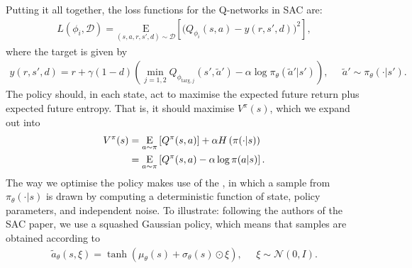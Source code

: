 \documentclass[letterpaper,10pt,english]{sphinxmanual}
\newcommand{\E}{{\mathrm E}}
\newcommand{\underE}[2]{\underset{\begin{subarray}{c}#1 \end{subarray}}{\E}\left[ #2 \right]}
\begin{document}
Putting it all together, the loss functions for the Q-networks in SAC are:
\begin{equation*}
\begin{split}L(\phi_i, {\mathcal D}) = \underset{(s,a,r,s',d) \sim {\mathcal D}}{{\mathrm E}}\left[
    \Bigg( Q_{\phi_i}(s,a) - y(r,s',d) \Bigg)^2
    \right],\end{split}
\end{equation*}
where the target is given by
\begin{equation*}
\begin{split}y(r, s', d) = r + \gamma (1 - d) \left( \min_{j=1,2} Q_{\phi_{\text{targ},j}}(s', \tilde{a}') - \alpha \log \pi_{\theta}(\tilde{a}'|s') \right), \;\;\;\;\; \tilde{a}' \sim \pi_{\theta}(\cdot|s').\end{split}
\end{equation*}
 The policy should, in each state, act to maximise the expected future return plus expected future entropy. That is, it should maximise \(V^{\pi}(s)\), which we expand out into
\begin{equation*}
\begin{split}V^{\pi}(s) &= \underE{a \sim \pi}{Q^{\pi}(s,a)} + \alpha H\left(\pi(\cdot|s)\right) \\
&= \underE{a \sim \pi}{Q^{\pi}(s,a) - \alpha \log \pi(a|s)}.\end{split}
\end{equation*}
The way we optimise the policy makes use of the , in which a sample from \(\pi_{\theta}(\cdot|s)\) is drawn by computing a deterministic function of state, policy parameters, and independent noise. To illustrate: following the authors of the SAC paper, we use a squashed Gaussian policy, which means that samples are obtained according to
\begin{equation*}
\begin{split}\tilde{a}_{\theta}(s, \xi) = \tanh\left( \mu_{\theta}(s) + \sigma_{\theta}(s) \odot \xi \right), \;\;\;\;\; \xi \sim \mathcal{N}(0, I).\end{split}
\end{equation*}
\end{document}
